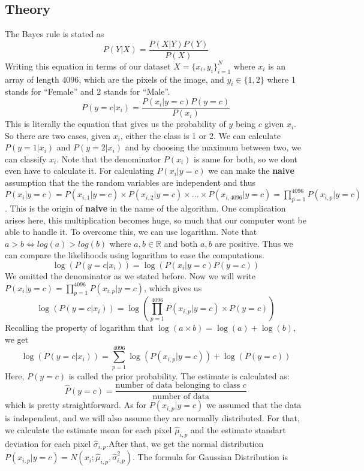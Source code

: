 \documentclass[12pt,reqno]{amsart}
\begin{document}
\subsection{Theory}
The Bayes rule is stated as
\begin{equation}
\label{EQ: Bayes Rule}
P(Y|X) = \frac{P(X|Y)P(Y)}{P(X)}
\end{equation}
Writing this equation in terms of our dataset $X = \{x_i, y_i\}_{i=1}^{N}$ where $x_i$ is an array of length $4096$, which are the pixels of the image, and $y_i \in \{1, 2\}$ where 1 stands for ``Female'' and 2 stands for ``Male''.
\begin{equation}
\label{EQ: Bayes Rule modified}
P(y = c|x_i) = \frac{P(x_i|y=c)P(y=c)}{P(x_i)}
\end{equation}
This is literally the equation that gives us the probability of $y$ being $c$ given $x_i$. So there are two cases, given $x_i$, either the class is 1 or 2. We can calculate $P(y=1|x_i)$ and $P(y=2|x_i)$ and by choosing the maximum between two, we can classify $x_i$. Note that the denominator $P(x_i)$ is same for both, so we dont even have to calculate it. For calculating $P(x_i|y=c)$ we can make the \textbf{naive} assumption that the the random variables are independent and thus $P(x_i|y = c) = P(x_{i,1}|y = c)\times P(x_{i,2}|y = c)\times...\times P(x_{i,4096}|y = c) = \prod_{p=1}^{4096}P(x_{i,p}|y=c)$. This is the origin of \textbf{naive} in the name of the algorithm. One complication arises here, this multiplication becomes huge, so much that our computer wont be able to handle it. To overcome this, we can use logarithm. Note that $a > b \iff log(a) > log(b)$ where $a, b \in \mathbb{R}$ and both $a,b$ are positive. Thus we can compare the likelihoods using logarithm to ease the computations.
\begin{equation}
\label{EQ: Bayes Rule modified}
\log(P(y = c|x_i)) = \log(P(x_i|y=c)P(y=c))
\end{equation}
We omitted the denominator as we stated before. Now we will write $P(x_i|y = c) = \prod_{p=1}^{4096}P(x_{i,p}|y=c) $, which gives us 
$$
\log(P(y = c|x_i)) =  \log(\prod_{p=1}^{4096}P(x_{i,p}|y=c)\times P(y=c))
$$
Recalling the property of logarithm that $\log(a\times b) = \log(a) + \log(b)$, we get
$$
\log(P(y = c|x_i)) =  \sum_{p=1}^{4096}\log(P(x_{i,p}|y=c)) + \log(P(y=c))
$$
Here, $P(y=c)$ is called the prior probability. The estimate is calculated as:
$$
\hat{P}(y=c) = \frac{\text{number of data belonging to class }c}{\text{number of data}}
$$
which is pretty straightforward. As for $P(x_{i,p}|y=c)$ we assumed that the data is independent, and we will also assume they are normally distributed. For that, we calculate the estimate mean for each pixel $\hat{\mu}_{i,p}$ and the estimate standart deviation for each pixel $\hat{\sigma}_{i,p}$.After that, we get the normal distribution $P(x_{i,p}|y=c) = N(x_i;\hat{\mu}_{i,p},\hat{\sigma}_{i,p}^2)$. The formula for Gaussian Distribution is
\end{document}
